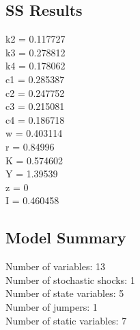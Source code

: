 \documentclass[letterpaper,12pt]{article}
\theoremstyle{definition}
\begin{document}
\subsection*{SS Results}



k2 	=	 0.117727\\
k3 	=	 0.278812\\
k4 	=	 0.178062\\
c1 	=	 0.285387\\
c2 	=	 0.247752\\
c3 	=	 0.215081\\
c4 	=	 0.186718\\
w  	=	 0.403114\\
r  	=	 0.84996\\
K  	=	 0.574602\\
Y  	=	 1.39539\\
z  	=	 0\\
I  	=	 0.460458\\



\subsection*{Model Summary}



  Number of variables:         13\\
  Number of stochastic shocks: 1\\
  Number of state variables:   5\\
  Number of jumpers:           1\\
  Number of static variables:  7\\
\end{document}
